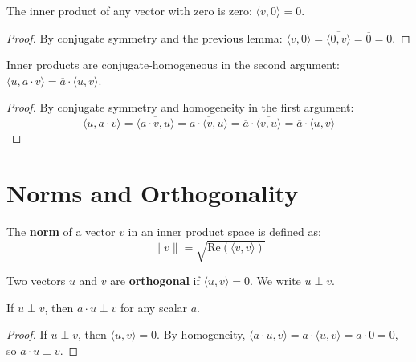 \begin{lemma}
  \label{lemma : inner_zero_right}
  \leanok
  The inner product of any vector with zero is zero: $\langle v, 0 \rangle = 0$.
\end{lemma}
\begin{proof}
  By conjugate symmetry and the previous lemma: $\langle v, 0 \rangle = \overline{\langle 0, v \rangle} = \overline{0} = 0$.
\end{proof}

\begin{lemma}
  \label{lemma : inner_smul_right}
  \leanok
  Inner products are conjugate-homogeneous in the second argument: $\langle u, a \cdot v \rangle = \overline{a} \cdot \langle u, v \rangle$.
\end{lemma}
\begin{proof}
  By conjugate symmetry and homogeneity in the first argument:
  $$\langle u, a \cdot v \rangle = \overline{\langle a \cdot v, u \rangle} = \overline{a \cdot \langle v, u \rangle} = \overline{a} \cdot \overline{\langle v, u \rangle} = \overline{a} \cdot \langle u, v \rangle$$
\end{proof}

\section{Norms and Orthogonality}

\begin{definition}
  \label{definition : norm}
  \leanok
  The \textbf{norm} of a vector $v$ in an inner product space is defined as:
  $$\|v\| = \sqrt{\text{Re}(\langle v, v \rangle)}$$
\end{definition}

\begin{definition}
  \label{definition : orthogonal}
  \leanok
  Two vectors $u$ and $v$ are \textbf{orthogonal} if $\langle u, v \rangle = 0$. We write $u \perp v$.
\end{definition}

\begin{lemma}
  \label{lemma : left_smul_ortho}
  \leanok
  If $u \perp v$, then $a \cdot u \perp v$ for any scalar $a$.
\end{lemma}
\begin{proof}
  If $u \perp v$, then $\langle u, v \rangle = 0$. By homogeneity, $\langle a \cdot u, v \rangle = a \cdot \langle u, v \rangle = a \cdot 0 = 0$, so $a \cdot u \perp v$.
\end{proof}

